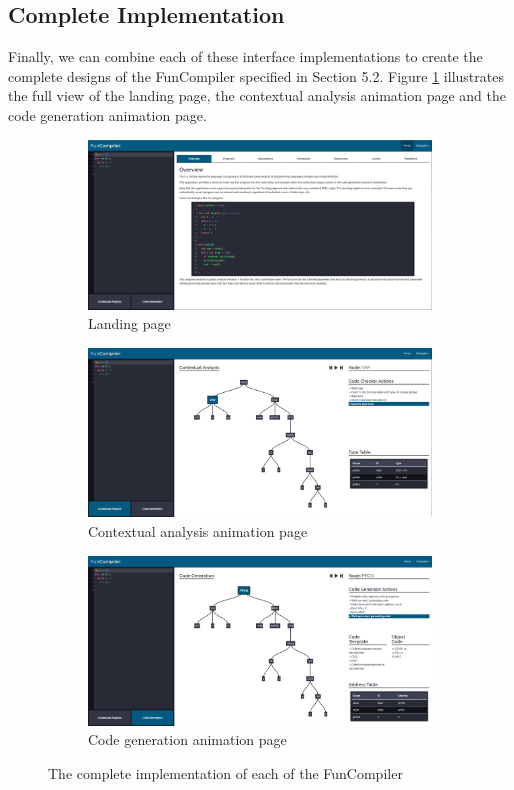 \documentclass{l4proj}
\begin{document}
\subsection{Complete Implementation}
Finally, we can combine each of these interface implementations to create the complete designs of the FunCompiler specified in Section 5.2. Figure \ref{fig:implfull} illustrates the full view of the landing page, the contextual analysis animation page and the code generation animation page. 
\begin{figure}[h]
	\centering
	\begin{subfigure}[b]{.33\textwidth}
		\centering
		\includegraphics[width=.95\linewidth]{images/implfull1.PNG}
		\caption{Landing page}
	\end{subfigure}%
	\begin{subfigure}[b]{.33\textwidth}
		\centering
		\includegraphics[width=.95\linewidth]{images/implfull2.PNG}
		\caption{Contextual analysis animation page}
	\end{subfigure}%
	\begin{subfigure}[b]{.33\textwidth}
		\centering
		\includegraphics[width=.95\linewidth]{images/implfull3.PNG}
		\caption{Code generation animation page}
	\end{subfigure}	
	\caption{The complete implementation of each of the FunCompiler}
	\label{fig:implfull}	
\end{figure}
\end{document}
